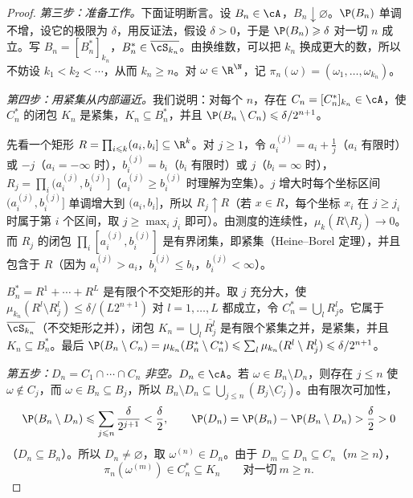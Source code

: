 \begin{proof}
\emph{第三步：准备工作。}下面证明断言。设 $B_n\in\cA$，$B_n\downarrow\varnothing$。$\P(B_n)$ 单调不增，设它的极限为 $\delta$，用反证法，假设 $\delta>0$，于是 $\P(B_n)\geqslant\delta$ 对一切 $n$ 成立。写 $B_n=[B_n^*]_{k_n}$，$B_n^*\in\overline{\cS_{k_n}}$。由换维数，可以把 $k_n$ 换成更大的数，所以不妨设 $k_1<k_2<\cdots$，从而 $k_n\geqslant n$。对 $\omega\in\R^\N$，记 $\pi_n(\omega)=(\omega_1,\dots,\omega_{k_n})$。

\emph{第四步：用紧集从内部逼近。}我们说明：对每个 $n$，存在 $C_n=[C_n^*]_{k_n}\in\cA$，使 $C_n^*$ 的闭包 $K_n$ 是紧集，$K_n\subseteq B_n^*$，并且 $\P(B_n\setminus C_n)\leqslant\delta/2^{n+1}$。

先看一个矩形 $R=\prod_{i\leqslant k}(a_i,b_i]\subseteq\R^k$。对 $j\geqslant1$，令 $a_i^{(j)}=a_i+\frac1j$（$a_i$ 有限时）或 $-j$（$a_i=-\infty$ 时），$b_i^{(j)}=b_i$（$b_i$ 有限时）或 $j$（$b_i=\infty$ 时），$R_j=\prod_i(a_i^{(j)},b_i^{(j)}]$（$a_i^{(j)}\geqslant b_i^{(j)}$ 时理解为空集）。$j$ 增大时每个坐标区间 $(a_i^{(j)},b_i^{(j)}]$ 单调增大到 $(a_i,b_i]$，所以 $R_j\uparrow R$（若 $x\in R$，每个坐标 $x_i$ 在 $j\geqslant j_i$ 时属于第 $i$ 个区间，取 $j\geqslant\max_ij_i$ 即可）。由测度的连续性，$\mu_k(R\setminus R_j)\to0$。而 $R_j$ 的闭包 $\prod_i[a_i^{(j)},b_i^{(j)}]$ 是有界闭集，即紧集（Heine--Borel 定理），并且包含于 $R$（因为 $a_i^{(j)}>a_i$，$b_i^{(j)}\leqslant b_i$，$b_i^{(j)}<\infty$）。

$B_n^*=R^1+\cdots+R^L$ 是有限个不交矩形的并。取 $j$ 充分大，使 $\mu_{k_n}(R^l\setminus R^l_j)\leqslant\delta/(L2^{n+1})$ 对 $l=1,\dots,L$ 都成立，令 $C_n^*=\bigcup_lR^l_j$。它属于 $\overline{\cS_{k_n}}$（不交矩形之并），闭包 $K_n=\bigcup_l\overline{R^l_j}$ 是有限个紧集之并，是紧集，并且 $K_n\subseteq B_n^*$。最后 $\P(B_n\setminus C_n)=\mu_{k_n}(B_n^*\setminus C_n^*)\leqslant\sum_l\mu_{k_n}(R^l\setminus R^l_j)\leqslant\delta/2^{n+1}$。

\emph{第五步：$D_n=C_1\cap\cdots\cap C_n$ 非空。}$D_n\in\cA$。若 $\omega\in B_n\setminus D_n$，则存在 $j\leqslant n$ 使 $\omega\notin C_j$，而 $\omega\in B_n\subseteq B_j$，所以 $B_n\setminus D_n\subseteq\bigcup_{j\leqslant n}(B_j\setminus C_j)$。由有限次可加性，
\[
\P(B_n\setminus D_n)\leqslant\sum_{j\leqslant n}\frac\delta{2^{j+1}}<\frac\delta2,\qquad \P(D_n)=\P(B_n)-\P(B_n\setminus D_n)>\frac\delta2>0
\]
（$D_n\subseteq B_n$）。所以 $D_n\neq\varnothing$，取 $\omega^{(n)}\in D_n$。由于 $D_m\subseteq D_n\subseteq C_n$（$m\geqslant n$），
\begin{equation}\label{eq:independence:kolmogorov-compact}
\pi_n(\omega^{(m)})\in C_n^*\subseteq K_n\qquad\text{对一切}\ m\geqslant n .
\end{equation}


\end{proof}
